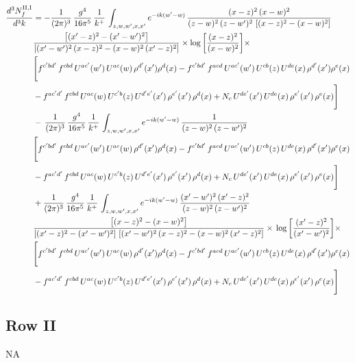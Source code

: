 \documentclass[9pt]{article}
\numberwithin{equation}{section}
\begin{document}
\begin{align}
    \frac{d^{3}N^{\rm II,I}_{f}}{d^{3}k}  & =   - \frac{1}{(2\pi)^{3}}\, \frac{g^{4}}{16\pi^{5}}\,\frac{1}{k^{+}}\,\int_{z,w,w^{\prime},x,x'} e^{-ik(w^{\prime}-w)}\,\frac{(x-z)^{2}\, (x-w)^{2}}{(z-w)^{2}\, (z-w')^{2}\,\left[(x-z)^{2} - (x-w)^{2}\right]}\notag \\ & \frac{\left[(x'-z)^{2}-(x'-w')^{2}\right]}{\left[(x'-w')^{2}\, (x-z)^{2} - (x-w)^{2}\, (x'-z)^{2}\right]}\times \log{\left[\frac{(x-z)^{2}}{(x-w)^{2}}\right]}\times\notag \\ & \Bigg[f^{c'bd'}\,f^{cbd}\, U^{ac'}(w')\,U^{ac}(w)\,\rho^{d'}(x')\rho^{d}(x)- f^{c'bd'}\,f^{acd}\,U^{ac'}(w')\,U^{cb}(z)\,U^{de}(x)\,\rho^{d'}(x')\rho^{e}(x) \notag \\ & -f^{ac'd'}\,f^{cbd}\,U^{ac}(w)\,U^{c'b}(z)\,U^{d'e'}(x')\,\rho^{e'}(x')\,\rho^{d}(x) +N_{c}\,U^{de'}(x')\,U^{de}(x)\,\rho^{e'}(x')\,\rho^{e}(x)\Bigg]  \notag \\
& -\, \frac{1}{(2\pi)^{3}}\, \frac{g^{4}}{16\pi^{5}}\,\frac{1}{k^{+}}\,\int_{z,w,w^{\prime},x,x'} e^{-ik(w^{\prime}-w)}\,\frac{1}{(z-w)^{2}\, (z-w')^{2}}\notag \\ & \Bigg[f^{c'bd'}\,f^{cbd}\, U^{ac'}(w')\,U^{ac}(w)\,\rho^{d'}(x')\rho^{d}(x)- f^{c'bd'}\,f^{acd}\,U^{ac'}(w')\,U^{cb}(z)\,U^{de}(x)\,\rho^{d'}(x')\rho^{e}(x) \notag \\ & -f^{ac'd'}\,f^{cbd}\,U^{ac}(w)\,U^{c'b}(z)\,U^{d'e'}(x')\,\rho^{e'}(x')\,\rho^{d}(x) +N_{c}\,U^{de'}(x')\,U^{de}(x)\,\rho^{e'}(x')\,\rho^{e}(x)\Bigg]  \notag \\
& + \frac{1}{(2\pi)^{3}}\, \frac{g^{4}}{16\pi^{5}}\,\frac{1}{k^{+}}\,\int_{z,w,w^{\prime},x,x'} e^{-ik(w^{\prime}-w)}\,\frac{(x'-w')^{2}\, (x'-z)^{2}}{(z-w)^{2}\, (z-w')^{2}}\notag \\ & \frac{\left[(x-z)^{2} - (x-w)^{2}\right]}{\left[(x'-z)^{2} - (x'-w')^{2}\right]\, \left[(x'-w')^{2}\, (x - z)^{2} - (x-w)^{2}\,(x'-z)^{2}\right]}\times\, \log{\left[\frac{(x'-z)^{2}}{(x'-w')^{2}}\right]}\times \notag \\ &  \Bigg[f^{c'bd'}\,f^{cbd}\, U^{ac'}(w')\,U^{ac}(w)\,\rho^{d'}(x')\rho^{d}(x)- f^{c'bd'}\,f^{acd}\,U^{ac'}(w')\,U^{cb}(z)\,U^{de}(x)\,\rho^{d'}(x')\rho^{e}(x) \notag \\ & -f^{ac'd'}\,f^{cbd}\,U^{ac}(w)\,U^{c'b}(z)\,U^{d'e'}(x')\,\rho^{e'}(x')\,\rho^{d}(x) +N_{c}\,U^{de'}(x')\,U^{de}(x)\,\rho^{e'}(x')\,\rho^{e}(x)\Bigg]
\end{align}
\subsection{Row II}
\textsc{NA}
\end{document}
